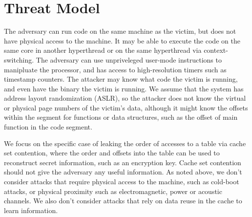 \section{Threat Model}
The adversary can run code on the same machine as the victim, but does not have physical access to the machine. It may be able to execute the code on the same core in another hyperthread or on the same hyperthread via context-switching. The adversary can use unpriveleged user-mode instructions to manipluate the processor, and has access to high-resolution timers such as timestamp counters. The attacker may know what code the victim is running, and even have the binary the victim is running. We assume that the system has address layout randomization (ASLR), so the attacker does not know the virtual or physical page numbers of the victim's data, although it might know the offsets within the segment for functions or data structures, such as the offset of main function in the code segment. 

We focus on the specific case of leaking the order of accesses to a table via cache set contention, where the order and offsets into the table can be used to reconstruct secret information, such as an encryption key. Cache set contention should not give the adversary any useful information. As noted above, we don't consider attacks that require physical access to the machine, such as cold-boot attacks, or physical proximity such as electromagnetic, power or acoustic channels. We also don't consider attacks that rely on data reuse in the cache to learn information.  
